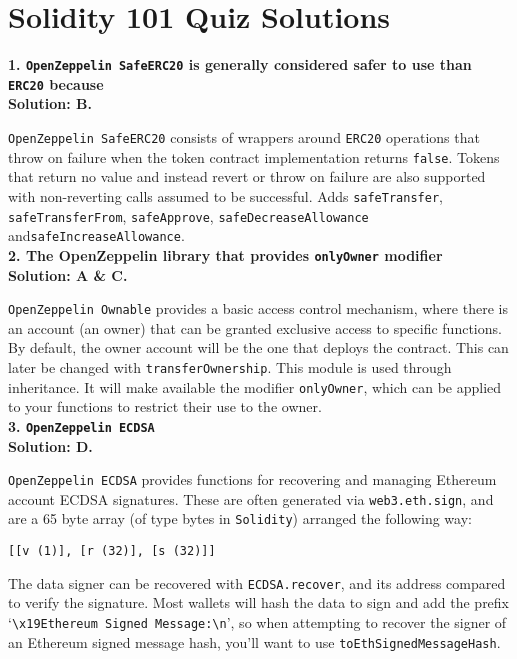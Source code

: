 \section{Solidity 101 Quiz Solutions}

\textbf{1. \texttt{OpenZeppelin SafeERC20} is generally considered safer to use than \texttt{ERC20} because}\label{sec:exam3_q1}\\

\textbf{Solution: B.}

\verb|OpenZeppelin SafeERC20| consists of wrappers around \verb|ERC20| operations that throw on failure when the token contract implementation returns \verb|false|.
Tokens that return no value and instead revert or throw on failure are also supported with non-reverting calls assumed to be successful.
Adds \verb|safeTransfer|, \verb|safeTransferFrom|, \verb|safeApprove|, \verb|safeDecreaseAllowance| and\linebreak\verb|safeIncreaseAllowance|.\\

\textbf{2. The OpenZeppelin library that provides \texttt{onlyOwner} modifier}\label{sec:exam3_q2}\\

\textbf{Solution: A \& C.}

\verb|OpenZeppelin Ownable| provides a basic access control mechanism, where there is an account (an owner) that can be granted exclusive access to specific functions.
By default, the owner account will be the one that deploys the contract.
This can later be changed with \verb|transferOwnership|.
This module is used through inheritance.
It will make available the modifier \verb|onlyOwner|, which can be applied to your functions to restrict their use to the owner.\\

\textbf{3. \texttt{OpenZeppelin ECDSA}}\label{sec:exam3_q3}\\

\textbf{Solution: D.}

\verb|OpenZeppelin ECDSA| provides functions for recovering and managing Ethereum account ECDSA signatures.
These are often generated via \verb|web3.eth.sign|, and are a 65 byte array (of type bytes in \verb|Solidity|) arranged the following way:
\begin{lstlisting}[style=defaultStyle]
[[v (1)], [r (32)], [s (32)]]
\end{lstlisting}

The data signer can be recovered with \verb|ECDSA.recover|, and its address compared to verify the signature.
Most wallets will hash the data to sign and add the prefix `\verb|\x19Ethereum Signed Message:\n|', so when attempting to recover the signer of an Ethereum signed message hash, you'll want to use \verb|toEthSignedMessageHash|.\\

